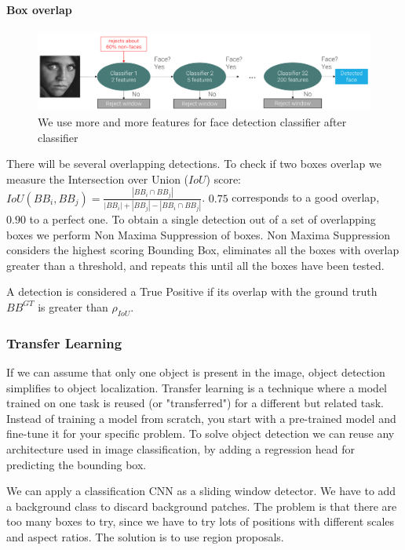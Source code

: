 \paragraph{Box overlap}

\begin{figure}[htbp]
  \centering
  \includegraphics[width=0.8\linewidth]{./img/cascade_classifier.png}
  \caption{We use more and more features for face detection classifier after classifier}
\end{figure}

There will be several overlapping detections.
To check if two boxes overlap we measure the Intersection over Union ($IoU$) score: $IoU(BB_i, BB_j) = \frac{|BB_i \cap BB_j|}{|BB_i| + |BB_j| - |BB_i \cap BB_j|}$. $0.75$ corresponds to a good overlap, $0.90$ to a perfect one.
To obtain a single detection out of a set of overlapping boxes we perform Non Maxima Suppression of boxes.
Non Maxima Suppression considers the highest scoring Bounding Box, eliminates all the boxes with overlap greater than a threshold, and repeats this until all the boxes have been tested.

A detection is considered a True Positive if its overlap with the ground truth $BB^{GT}$ is greater than $\rho_{IoU}$.

\subsubsection{Transfer Learning}
If we can assume that only one object is present in the image, object detection simplifies to object localization.
Transfer learning is a technique where a model trained on one task is reused (or "transferred") for a different but related task.
Instead of training a model from scratch, you start with a pre-trained model and fine-tune it for your specific problem.
To solve object detection we can reuse any architecture used in image classification, by adding a regression head for predicting the bounding box.

We can apply a classification CNN as a sliding window detector.
We have to add a background class to discard background patches.
The problem is that there are too many boxes to try, since we have to try lots of positions with different scales and aspect ratios.
The solution is to use region proposals.

